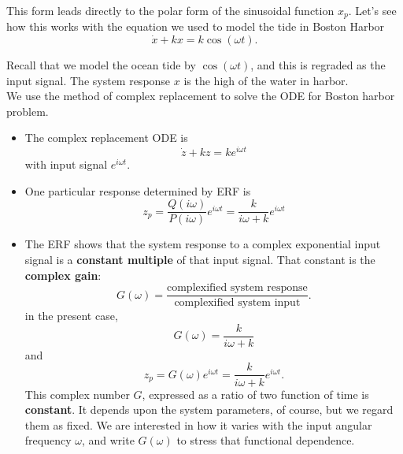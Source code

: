 This form leads directly to the polar form of the sinusoidal function $x_ p$.
Let's see how this works with the equation we used to model the tide in Boston Harbor
\begin{equation*}
  \dot x + kx = k\cos (\omega t).
\end{equation*}

Recall that we model the ocean tide by $\cos (\omega t)$, and this is regraded as the input signal.
The system response $x$ is the high of the water in harbor.\\

We use the method of complex replacement to solve the ODE for Boston harbor problem.

\begin{itemize}
\item The complex replacement ODE is
  \begin{equation*}
    \dot z + kz = k e^{i \omega t}
  \end{equation*}
  with input signal $e^{i \omega t}$.
\item One particular response determined by ERF is
  \begin{equation*}
    \displaystyle z_ p
    \displaystyle = \frac{Q(i \omega)}{P(i \omega)} e^{i \omega t}
    \displaystyle = \frac{k}{i \omega + k} e^{i \omega t}
  \end{equation*}
\item The ERF shows that the system response to a complex exponential input signal is a
  \textbf{constant multiple} of that input signal.
  That constant is the \textbf{\color{blue}complex gain}:
  \begin{equation*}
    \displaystyle  G(\omega ) \displaystyle  =
    \displaystyle
    \frac{\text {complexified system response}}{\text {complexified system input}}.
  \end{equation*}
  in the present case,
  \begin{equation*}
    G(\omega) = \frac{k}{i \omega + k}
  \end{equation*}
  and
  \begin{equation*}
    \displaystyle  z_ p =G(\omega )e^{i\omega t} =  \frac{k}{i\omega + k}e^{i\omega t}.
  \end{equation*}
  This complex number $G$, expressed as a ratio of two function of time is \textbf{constant}.
  It depends upon the system parameters, of course, but we regard them as fixed.
  We are interested in how it varies with the input angular frequency $\omega$, and
  write $G(\omega)$ to stress that functional dependence.

\end{itemize}
